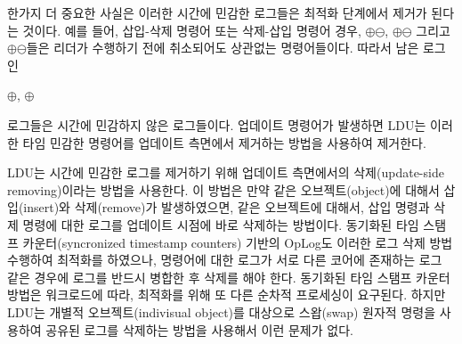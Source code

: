 한가지 더 중요한 사실은 이러한 시간에 민감한 로그들은 최적화 단계에서 제거가 된다는 것이다.
예를 들어, 삽입-삭제 명령어 또는 삭제-삽입 명령어 경우,
$\oplus$$\ominus$, $\oplus$$\ominus$ 
그리고 $\oplus$$\ominus$들은 리더가 수행하기 전에
 취소되어도 상관없는 명령어들이다. 
따라서 남은 로그인 
\begin{center}
 $\oplus$, $\oplus$
\end{center}
로그들은 시간에 민감하지 않은 로그들이다.
업데이트 명령어가 발생하면 LDU는 이러한 타임 민감한 명령어를 업데이트 측면에서 제거하는 방법을 
사용하여 제거한다.



LDU는 시간에 민감한 로그를 제거하기 위해 업데이트 측면에서의 삭제(update-side removing)이라는 방법을 사용한다.
이 방법은 만약 같은 오브젝트(object)에 대해서 삽입(insert)와 삭제(remove)가 발생하였으면, 같은 오브젝트에
대해서, 삽입 명령과 삭제 명령에 대한 로그를 업데이트 시점에 바로 삭제하는 방법이다. 
동기화된 타임 스탬프 카운터(syncronized timestamp counters) 기반의 OpLog도 이러한 로그 삭제 방법 수행하여
최적화를 하였으나, 명령어에 대한 로그가 서로 다른 코어에 존재하는 로그 같은 경우에 로그를 반드시 병합한 후
 삭제를 해야 한다.
동기화된 타임 스탬프 카운터 방법은 워크로드에 따라, 최적화를 위해 또 다른
순차적 프로세싱이 요구된다.
하지만 LDU는 개별적 오브젝트(indivisual object)를 대상으로 스왑(swap) 원자적 명령을
사용하여 공유된 로그를 삭제하는 방법을 사용해서 이런 문제가 없다.


